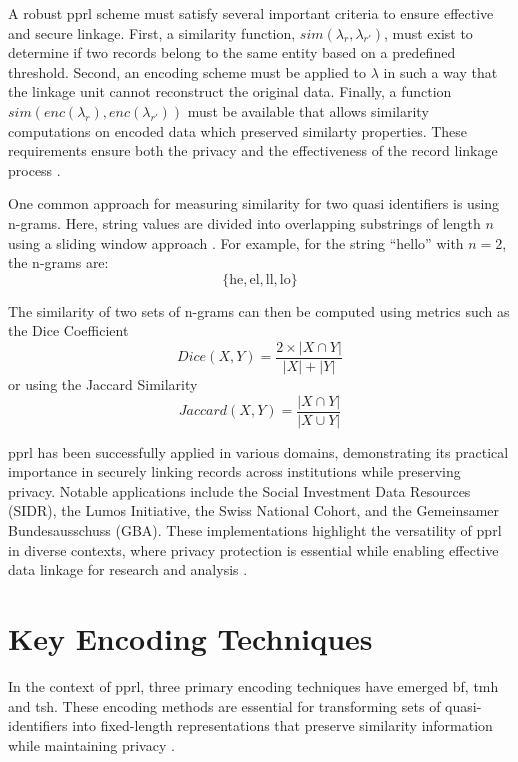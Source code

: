 A robust \ac{pprl} scheme must satisfy several important criteria to ensure effective and secure linkage.
First, a similarity function, \(sim(\lambda_r, \lambda_{r'})\), must exist to determine if two records belong to the same entity based on a predefined threshold.
Second, an encoding scheme must be applied to \(\lambda\) in such a way that the linkage unit cannot reconstruct the original data.
Finally, a function \(sim(enc(\lambda_r), enc(\lambda_{r'}))\) must be available that allows similarity computations on encoded data which preserved similarty properties.
These requirements ensure both the privacy and the effectiveness of the record linkage process \cite{schaefer2024}.

One common approach for measuring similarity for two quasi identifiers is using n-grams.
Here, string values are divided into overlapping substrings of length $n$ using a sliding window approach \cite{schaefer2024}.
For example, for the string ``hello'' with $n=2$, the n-grams are:
$$ \{\text{he}, \text{el}, \text{ll}, \text{lo} \} $$

The similarity of two sets of n-grams can then be computed using metrics such as the Dice Coefficient \cite{schaefer2024}
  $$ Dice(X, Y) = \frac{2 \times |X \cap Y|}{|X| + |Y|} $$
or using the Jaccard Similarity \cite{schaefer2024}
  $$ Jaccard(X, Y) = \frac{|X \cap Y|}{|X \cup Y|} $$

\ac{pprl} has been successfully applied in various domains, demonstrating its practical importance in securely linking records across institutions while preserving privacy.
Notable applications include the Social Investment Data Resources (SIDR), the Lumos Initiative, the Swiss National Cohort, and the Gemeinsamer Bundesausschuss (GBA).
These implementations highlight the versatility of \ac{pprl} in diverse contexts, where privacy protection is essential while enabling effective data linkage for research and analysis \cite{schaefer2024}.



\section{Key Encoding Techniques} \label{sec:key-encodings}

In the context of \ac{pprl}, three primary encoding techniques have emerged \ac{bf}, \ac{tmh} and \ac{tsh}.
These encoding methods are essential for transforming sets of quasi-identifiers into fixed-length representations that preserve similarity information while maintaining privacy \cite{schaefer2024,vidanage2020graph, schnell2009privacy}.

